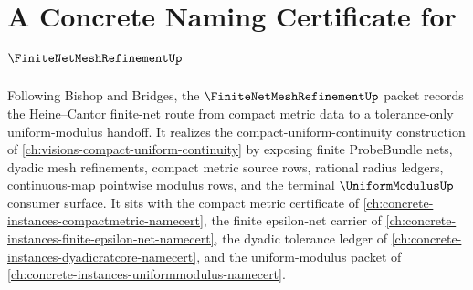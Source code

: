 \chapter{A Concrete Naming Certificate for $\FiniteNetMeshRefinementUp$}
\label{ch:concrete-instances-finite-net-mesh-refinement-namecert}

Following Bishop and Bridges, the $\FiniteNetMeshRefinementUp$ packet records the Heine--Cantor finite-net route from compact metric data to a tolerance-only uniform-modulus handoff. It realizes the compact-uniform-continuity construction of \autoref{ch:visions-compact-uniform-continuity} by exposing finite ProbeBundle nets, dyadic mesh refinements, compact metric source rows, rational radius ledgers, continuous-map pointwise modulus rows, and the terminal $\UniformModulusUp$ consumer surface. It sits with the compact metric certificate of \autoref{ch:concrete-instances-compactmetric-namecert}, the finite epsilon-net carrier of \autoref{ch:concrete-instances-finite-epsilon-net-namecert}, the dyadic tolerance ledger of \autoref{ch:concrete-instances-dyadicratcore-namecert}, and the uniform-modulus packet of \autoref{ch:concrete-instances-uniformmodulus-namecert}.

